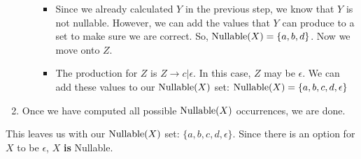 \begin{blackbox}
\begin{enumerate}[noitemsep]
\begin{itemize}[noitemsep]
      \begin{itemize}[noitemsep]
      \item Since we already calculated $Y$ in the previous step, we know that $Y$ is not nullable.
        However, we can add the values that $Y$ can produce to a set to make sure we are correct.
        So, $\operatorname{\text{Nullable}}(X) = \lbrace a, b, d \rbrace$.
        Now we move onto $Z$.
      \item The production for $Z$ is $Z \rightarrow c \vert \epsilon$.
        In this case, $Z$ may be $\epsilon$.
        We can add these values to our $\operatorname{\text{Nullable}}(X)$ set: $\operatorname{\text{Nullable}}(X) = \lbrace a, b, c, d, \epsilon \rbrace$
      \end{itemize}
    \end{itemize}
  \item Once we have computed all possible $\operatorname{\text{Nullable}}(X)$ occurrences, we are done.
  \end{enumerate}

  This leaves us with our $\operatorname{\text{Nullable}}(X)$ set: $\lbrace a, b, c, d, \epsilon \rbrace$.
  Since there is an option for $X$ to be $\epsilon$, $X$ \textbf{is} Nullable.
\end{blackbox}

